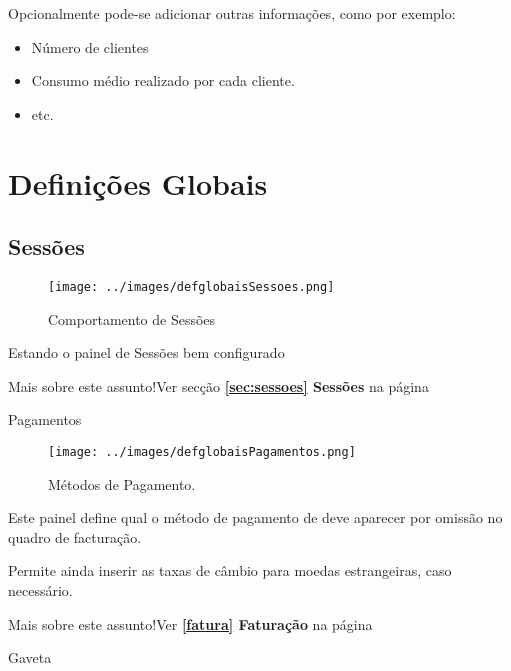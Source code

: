 \documentclass[a4paper,11pt,openany]{memoir}
\newcommand\relacionados{\texttt{[image: ../small-n-flat-master/png/96/file-link.png]}}
\newcommand{\bcrelacionados}[2]{\vspace{5mm}\begin{bclogo}[logo=\relacionados]{\hspace{0.7cm}Mais sobre este assunto!}{#1}\end{bclogo}}
\begin{document}
Opcionalmente pode-se adicionar outras informações, como por exemplo: 
\begin{itemize}
\item Número de clientes
\item Consumo médio realizado por cada cliente.
\item etc.
\end{itemize}

\newpage
\section{Definições Globais}
\subsection{Sessões}
\begin{figure}[h]
\begin{center}
\texttt{[image: ../images/defglobaisSessoes.png]}
\caption[Submanifold]{Comportamento de Sessões}
\label{fig:defglobaisSessoes}
\end{center}
\end{figure}

Estando o painel de Sessões bem configurado


\bcrelacionados{Ver secção \textbf{\ref{sec:sessoes} Sessões} na página \pageref{sec:sessoes}}

\subsection{Pagamentos}

\begin{figure}[h]
\begin{center}
\texttt{[image: ../images/defglobaisPagamentos.png]}
\caption[Submanifold]{Métodos de Pagamento.}
\label{fig:defglobaisPagamentos}
\end{center}
\end{figure}

Este painel define qual o método de pagamento de deve aparecer por omissão no quadro de facturação. 

Permite ainda inserir as taxas de câmbio para moedas estrangeiras, caso necessário.

\bcrelacionados{Ver \textbf{\ref{fatura} Faturação} na página \pageref{fatura}}



\subsection{Gaveta}
\end{document}
